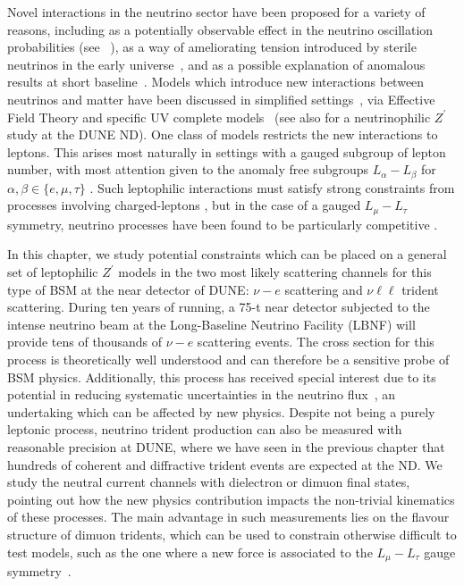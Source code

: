 \graphicspath{{}{Zprime_scattering/figs/}{diagrams/}}

Novel interactions in the neutrino sector have been proposed for a variety of reasons, including as a potentially observable effect in the neutrino oscillation probabilities (see \eg\ \cite{Blennow:2016jkn}), as a way of ameliorating tension introduced by sterile neutrinos in the early universe~\cite{Hannestad:2013ana, Dasgupta:2013zpn,Mirizzi:2014ama,Cherry:2016jol,Capozzi:2017auw,Denton:2018dqq,Chu:2018gxk,Esmaili:2018qzu}, and as a possible explanation of anomalous results at short baseline~\cite{Bertuzzo:2018itn,Ballett:2018ynz,Arguelles:2018mtc}. Models which introduce new interactions between neutrinos and matter have been discussed in simplified settings~\cite{Boehm:2004uq, Cerdeno:2016sfi,Denton:2018xmq}, via Effective Field Theory \cite{Falkowski:2018dmy,Falkowski:2019xoe} and specific UV complete models~\cite{Farzan:2015doa} (see also \cite{Bakhti:2018avv} for a neutrinophilic $Z^\prime$ study at the DUNE ND).
%
One class of models restricts the new interactions to leptons. This arises most naturally in settings with a gauged subgroup of lepton number, with most attention given to the anomaly free subgroups $L_\alpha - L_\beta$ for $\alpha,\beta \in \{e,\mu,\tau\}$ \cite{He:1991qd,He:1990pn}. Such leptophilic interactions must satisfy strong constraints from processes involving charged-leptons \cite{Bauer:2018onh}, but in the case of a gauged $L_\mu - L_\tau$ symmetry, neutrino processes have been found to be particularly competitive \cite{Altmannshofer2014}.

In this chapter, we study potential constraints which can be placed on a general set of leptophilic $Z^\prime$ models in the two most likely scattering channels for this type of BSM at the near detector of DUNE: $\nu-e$ scattering and $\nu\ell\ell$ trident scattering. During ten years of running, a 75-t near detector subjected to the intense neutrino beam at the Long-Baseline Neutrino Facility (LBNF) will provide tens of thousands of $\nu-e$ scattering events. The cross section for this process is theoretically well understood and can therefore be a sensitive probe of BSM physics. Additionally, this process has received special interest due to its potential in reducing systematic uncertainties in the neutrino flux~\cite{Park:2013dax,Bian:2017axs}, an undertaking which can be affected by new physics. Despite not being a purely leptonic process, neutrino trident production can also be measured with reasonable precision at DUNE, where we have seen in the previous chapter that hundreds of coherent and diffractive trident events are expected at the ND. We study the neutral current channels with dielectron or dimuon final states, pointing out how the new physics contribution impacts the non-trivial kinematics of these processes. The main advantage in such measurements lies on the flavour structure of dimuon tridents, which can be used to constrain otherwise difficult to test models, such as the one where a new force is associated to the $L_\mu-L_\tau$ gauge symmetry~\cite{Altmannshofer2014}.

